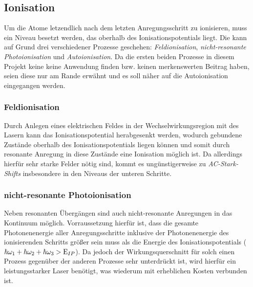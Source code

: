 \subsection{Ionisation}\label{subsec:ionisation}
Um die Atome letzendlich nach dem letzten Anregungsschritt zu ionisieren, muss
ein Niveau besetzt werden, das oberhalb des Ionisationspotentials liegt. Die
kann auf Grund drei verschiedener Prozesse geschehen: \textit{Feldionisation},
\textit{nicht-resonante Photoionisation} und \textit{Autoionisation}. Da die
ersten beiden Prozesse in diesem Projekt keine keine Anwendung finden bzw.
keinen merkenswerten Beitrag haben, seien diese nur am Rande erwähnt und es soll
näher auf die Autoionisation eingegangen werden.

\subsubsection{Feldionisation}\label{subsubsec:feldionisation}
Durch Anlegen eines elektrischen Feldes in der Wechselwirkungsregion mit des
Lasern kann das Ionisationspotential herabgesenkt werden, wodurch gebundene
Zustände oberhalb des Ionisationspotentials liegen können und somit durch
resonante Anregung in diese Zustände eine Ionisation möglich ist. Da allerdings
hierfür sehr starke Felder nötig sind, kommt es ungünstigerweise zu
\textit{AC-Stark-Shifts} insbesondere in den Niveaus der unteren Schritte.

\subsubsection{nicht-resonante
Photoionisation}\label{subsubsec:nicht-resonante_photoionisation}
Neben resonanten Übergängen sind auch nicht-resonante Anregungen in das
Kontinuum möglich. Vorraussetzung hierfür ist, dass die gesamte Photonenenergie
aller Anregungsschritte inklusive der Photonenenergie des ionisierenden Schritts
größer sein muss als die Energie des Ionisationspotentials
($\hbar\omega_1+\hbar\omega_2+\hbar\omega_3>\operatorname{E}_{IP}$). Da jedoch der
Wirkungsquerschnitt für solch einen Prozess gegenüber der anderen Prozesse
sehr unterdrückt ist, wird hierfür ein leistungsstarker Laser
benötigt, was wiederum mit erheblichen Kosten verbunden ist.

